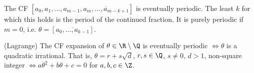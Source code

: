 \documentclass{article}
\begin{document}
\begin{defi}
    The CF $[a_0, a_1, \dotsc, a_{m-1}, \overline{a_m, \dotsc, a_{m-k+1}}]$ is eventually periodic.
    The least $k$ for which this holds is the period of the continued fraction.
    It is purely periodic if $m=0$, i.e. $\theta = [\overline{a_0, \dotsc, a_{k-1}}]$.
\end{defi}

\begin{nthm}(Lagrange)\label{thm:6.7}
    The CF expansion of $\theta \in \R \setminus \Q$ is eventually periodic $\iff \theta$ is a quadratic irrational.
    That is, $\theta = r + s \sqrt{d}$, $r, s \in \Q$, $s \neq 0$, $d > 1$, non-square integer $\iff a \theta^2 + b \theta + c = 0$ for $a, b, c \in \Z$.
\end{nthm}
\end{document}
